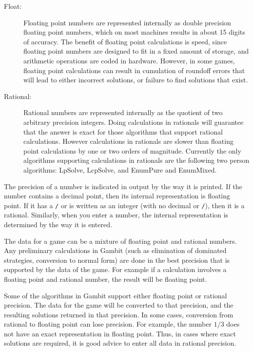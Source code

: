 \begin{description}
\item[Float:] Floating point numbers are represented internally as double 
precision floating point numbers, which on most machines results in 
about 15 digits of accuracy.  
The benefit of floating point calculations is speed, since floating point 
numbers are designed to fit in a fixed amount of storage, and arithmetic 
operations are coded in hardware.  However,  in some games, 
floating point calculations can result in cumulation of roundoff errors that will 
lead to either incorrect solutions, or failure to find solutions that exist.  
\item[Rational:]  Rational numbers are represented internally as the 
quotient of two arbitrary precision integers.  Doing 
calculations in rationals will guarantee that the answer is exact  
for those algorithms that support rational calculations.  However 
calculations in rationals are slower than floating point calculations by one or 
two orders of magnitude.  Currently the only algorithms supporting 
calculations in rationals are the following two person 
algorithms: LpSolve, LcpSolve, and EnumPure and EnumMixed.  
\end{description}

The precision of a number is indicated in output by 
the way it is printed.  If the number contains a decimal point, then its 
internal representation is floating point.  If it has a \verb+/+ or is written 
as an integer (with no decimal or \verb+/+), then it is a rational.  
Similarly, when you enter a number, 
the internal representation is determined by the way it is entered.  

The data for a game can be a mixture of floating point and rational numbers.  
Any preliminary calculations in Gambit (such as elimination of dominated 
strategies, conversion to normal form) are done in the best precision that 
is supported by the data of the game.  For example if a calculation involves 
a floating point and rational number, the result will be floating point. 

Some of the algorithms in Gambit support either  
floating point or rational precision. The data for the game will be converted 
to that precision, and the resulting solutions returned in that precision.  In 
some cases, conversion from rational to floating point 
can lose precision.  For example, the number $1/3$ does not have an 
exact representation in floating point.  Thus, in 
cases where exact solutions are required, it is good advice to enter all data 
in rational precision.  

